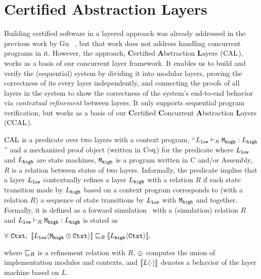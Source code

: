 \section{Certified Abstraction Layers}
\label{chapter:ccal:sec:cal}


Building certified software in a layered approach was already addressed in the previous work by Gu \etal~\cite{deepspec},
but that work does not address handling concurrent programs in it.
However, the approach, \textbf{C}ertified \textbf{A}bstraction \textbf{L}ayers ($\mathrm{CAL}$), works as a basis of our concurrent layer framework.
It enables us to build and verify the (sequential) system by dividing it into modular layers, 
proving the correctness of its every layer independently, and connecting the proofs of all layers in the system to show the correctness of the system's end-to-end behavior via \textit{contextual refinement} between layers. 
It only supports sequential program verification, but works as a basis of our \textbf{C}ertified \textbf{C}oncurrent \textbf{A}bstraction \textbf{L}ayers ($\mathrm{CCAL}$).

$\mathrm{CAL}$ is a predicate over two layers with a context program, 
``$L_{{\mathrm{\texttt{low}}}} \vdash_{R} {\mathrm{\texttt{M}}}_{\mathrm{\texttt{high}}} : L_{{\mathrm{\texttt{high}}}}$'' 
and a mechanized proof object (written in $\mathrm{Coq}$) for the predicate where $L_{{\mathrm{\texttt{low}}}}$ and $L_{{\mathrm{\texttt{high}}}}$ are state machines, ${\mathrm{\texttt{M}}}_{\mathrm{\texttt{high}}}$ is a program written in C and/or Assembly, $R$ is a relation between states of two layers.
Informally, the predicate implies that 
a layer $L_{{\mathrm{\texttt{low}}}}$ contextually refines  a layer $L_{{\mathrm{\texttt{high}}}}$ with a relation $R$
 if each state transition made by $L_{{\mathrm{\texttt{high}}}}$ based on a context program  
 corresponds to (with a relation $R$)  a sequence of 
 state transitions by $L_{{\mathrm{\texttt{low}}}}$ with ${\mathrm{\texttt{M}}}_{{\mathrm{\texttt{high}}}}$ and   together.
 Formally, it is defined as a forward simulation~\cite{Lynch95,leroy09,Milner71,Park81} with a (simulation) relation $R$
 and  $L_{{\mathrm{\texttt{low}}}} \vdash_{R} {\mathrm{\texttt{M}}}_{{\mathrm{\texttt{high}}}}  : L_{{\mathrm{\texttt{high}}}}$ is stated as
 \begin{center}
$\forall\ \codeinmath{Ctxt},\ \sem{L_{\codeinmath{low}}}{\modulecompose{\codeinmath{M}_{\codeinmath{high}}}{\codeinmath{Ctxt}}} \refines_{R} \sem{L_{\codeinmath{high}}}{\codeinmath{Ctxt}},$
\end{center}
where $\sqsubseteq_{R}$ is a refinement relation with $R$, 
$\oplus$ computes the union 
 of implementation modules and contexts,
and $[\![{L} \langle {\cdot} \rangle]\!]$ denotes a  behavior of the layer machine based on $L$.


